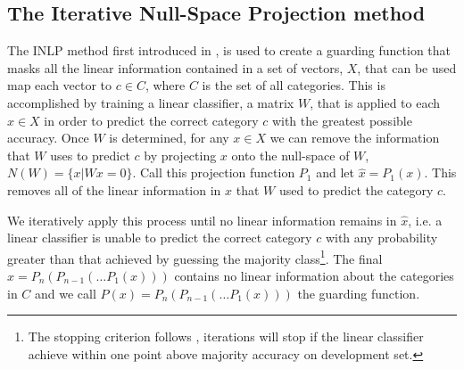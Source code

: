 \documentclass[11pt,a4paper]{article}
\begin{document}
\subsection{The Iterative Null-Space Projection method}
\label{sec:inlp-method}

The INLP method first introduced in \citealp{inlp}, is used to create a guarding function that masks all the linear information contained in a set of vectors, $X$, that can be used map each vector to $c \in C$, where $C$ is the set of all categories. This is accomplished by training a linear classifier, a matrix $W$, that is applied to each $x \in X$ in order to predict the correct category $c$ with the greatest possible accuracy. 
Once $W$ is determined, for any $x \in X$ we can remove the information that $W$ uses to predict $c$ by projecting $x$ onto the null-space of $W$, $N(W) = \{x | Wx=0\}$. Call this projection function $P_1$ and let $\hat{x} = P_1(x)$. This removes all of the linear information in $x$ that $W$ used to predict the category $c$. 


We iteratively apply this process until no linear information remains in $\hat{x}$, i.e. a linear classifier is unable to predict the correct category $c$ with any probability greater than that achieved by guessing the majority class\footnote{The stopping criterion follows \citealp{amnesia}, iterations will stop if the linear classifier achieve within one point above majority accuracy on development set.}. The final $\hat{x} = P_n(P_{n-1}(\dots P_1(x)))$ contains no linear information about the categories in $C$ and we call $P(x) = P_n(P_{n-1}(\dots P_1(x)))$ the guarding function. 
\end{document}
